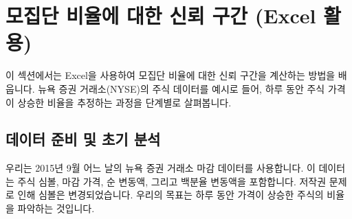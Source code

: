 \documentclass[11pt,a4paper]{article}
\begin{document}
\newpage
\section{모집단 비율에 대한 신뢰 구간 (Excel 활용)}
이 섹션에서는 Excel을 사용하여 모집단 비율에 대한 신뢰 구간을 계산하는 방법을 배웁니다. 뉴욕 증권 거래소(NYSE)의 주식 데이터를 예시로 들어, 하루 동안 주식 가격이 상승한 비율을 추정하는 과정을 단계별로 살펴봅니다.

\subsection{데이터 준비 및 초기 분석}
우리는 2015년 9월 어느 날의 뉴욕 증권 거래소 마감 데이터를 사용합니다. 이 데이터는 주식 심볼, 마감 가격, 순 변동액, 그리고 백분율 변동액을 포함합니다. 저작권 문제로 인해 심볼은 변경되었습니다. 우리의 목표는 하루 동안 가격이 상승한 주식의 비율을 파악하는 것입니다.
\end{document}
